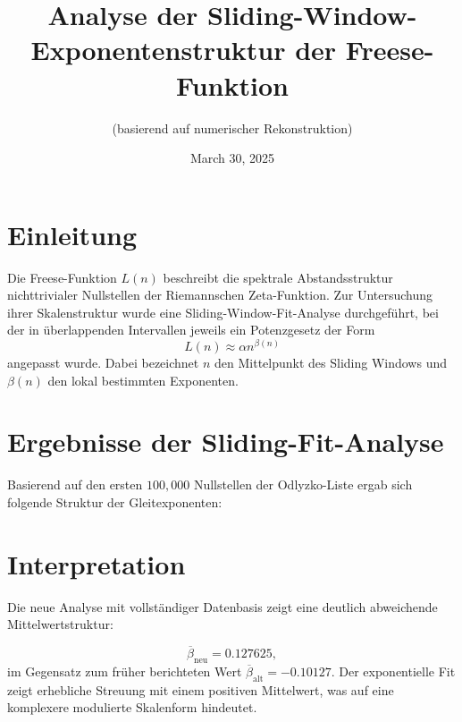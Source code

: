 \documentclass[12pt]{article}
\title{Analyse der Sliding-Window-Exponentenstruktur der Freese-Funktion}
\author{(basierend auf numerischer Rekonstruktion)}
\date{March 30, 2025}
\begin{document}
\maketitle

\section{Einleitung}
Die Freese-Funktion $L(n)$ beschreibt die spektrale Abstandsstruktur nichttrivialer Nullstellen der Riemannschen Zeta-Funktion.
Zur Untersuchung ihrer Skalenstruktur wurde eine Sliding-Window-Fit-Analyse durchgeführt, bei der in überlappenden Intervallen jeweils ein Potenzgesetz der Form
\[
L(n) \approx \alpha n^{\beta(n)}
\]
angepasst wurde. Dabei bezeichnet $n$ den Mittelpunkt des Sliding Windows und $\beta(n)$ den lokal bestimmten Exponenten.

\section{Ergebnisse der Sliding-Fit-Analyse}
Basierend auf den ersten $100{,}000$ Nullstellen der Odlyzko-Liste ergab sich folgende Struktur der Gleitexponenten:

\begin{center}
\end{center}

\section{Interpretation}
Die neue Analyse mit vollständiger Datenbasis zeigt eine deutlich abweichende Mittelwertstruktur:

\[
\overline{\beta}_{\text{neu}} = 0.127625,
\]
im Gegensatz zum früher berichteten Wert $\overline{\beta}_{\text{alt}} = -0.10127$. Der exponentielle Fit zeigt erhebliche Streuung mit einem positiven Mittelwert, was auf eine komplexere modulierte Skalenform hindeutet.
\end{document}
